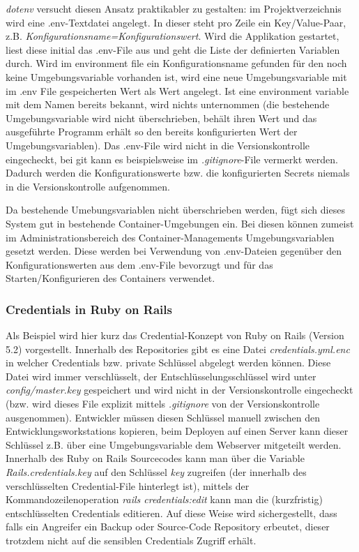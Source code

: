 \textit{dotenv} versucht diesen Ansatz praktikabler zu gestalten: im Projektverzeichnis wird eine .env-Textdatei angelegt. In dieser steht pro Zeile ein Key/Value-Paar, z.B. \textit{Konfigurationsname=Konfigurationswert}. Wird die Applikation gestartet, liest diese initial das .env-File aus und geht die Liste der definierten Variablen durch. Wird im environment file ein Konfigurationsname gefunden für den noch keine Umgebungsvariable vorhanden ist, wird eine neue Umgebungsvariable mit im .env File gespeicherten Wert als Wert angelegt. Ist eine environment variable mit dem Namen bereits bekannt, wird nichts unternommen (die bestehende Umgebungsvariable wird nicht überschrieben, behält ihren Wert und das ausgeführte Programm erhält so den bereits konfigurierten Wert der Umgebungsvariablen). Das .env-File wird nicht in die Versionskontrolle eingecheckt, bei git kann es beispielsweise im \textit{.gitignore}-File vermerkt werden. Dadurch werden die Konfigurationswerte bzw. die konfigurierten Secrets niemals in die Versionskontrolle aufgenommen.

Da bestehende Umebungsvariablen nicht überschrieben werden, fügt sich dieses System gut in bestehende Container-Umgebungen ein. Bei diesen können zumeist im Administrationsbereich des Container-Managements Umgebungsvariablen gesetzt werden. Diese werden bei Verwendung von .env-Dateien gegenüber den Konfigurationswerten aus dem .env-File bevorzugt und für das Starten/Konfigurieren des Containers verwendet.

\subsubsection{Credentials in Ruby on Rails}

Als Beispiel wird hier kurz das Credential-Konzept von Ruby on Rails (Version 5.2) vorgestellt. Innerhalb des Repositories gibt es eine Datei \textit{credentials.yml.enc} in welcher Credentials bzw. private Schlüssel abgelegt werden können. Diese Datei wird immer verschlüsselt, der Entschlüsselungsschlüssel wird unter \textit{config/master.key} gespeichert und wird nicht in der Versionskontrolle eingecheckt (bzw. wird dieses File explizit mittels \textit{.gitignore} von der Versionskontrolle ausgenommen). Entwickler müssen diesen Schlüssel manuell zwischen den Entwicklungsworkstations kopieren, beim Deployen auf einen Server kann dieser Schlüssel z.B. über eine Umgebungsvariable dem Webserver mitgeteilt werden. Innerhalb des Ruby on Rails Sourcecodes kann man über die Variable \textit{Rails.credentials.key} auf den Schlüssel \textit{key} zugreifen (der innerhalb des verschlüsselten Credential-File hinterlegt ist), mittels der Kommandozeilenoperation \textit{rails credentials:edit} kann man die (kurzfristig) entschlüsselten Credentials editieren. Auf diese Weise wird sichergestellt, dass falls ein Angreifer ein Backup oder Source-Code Repository erbeutet, dieser trotzdem nicht auf die sensiblen Credentials Zugriff erhält.

